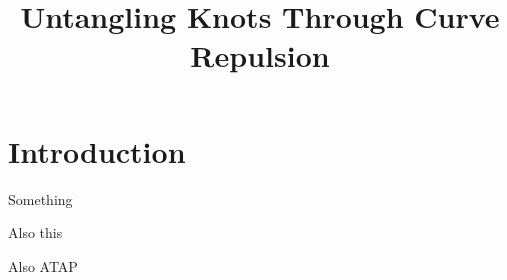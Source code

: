 \documentclass[a4paper, 12pt]{article}
\title{Untangling Knots Through Curve Repulsion}
\author{}
\begin{document}


\section{Introduction}


Something \cite{YSC2021}

Also this \cite{BO1995}

Also ATAP \cite{Trefethen_2020}

\printbibliography
\end{document}
